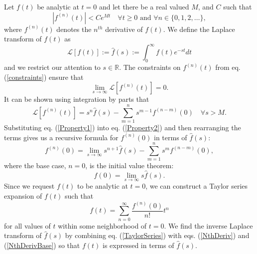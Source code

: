 Let $f(t)$ be analytic at $t=0$ and let there
  be a real valued $M$, and $C$ such that
\begin{equation}\label{constraints}
  \left|f^{(n)}(t)\right| < Ce^{Mt}\quad \forall t\geq 0\text{ and }\forall n\in\{0,1,2,\dots\},
\end{equation}
where $f^{(n)}(t)$ denotes the $n^{th}$ derivative of $f(t)$.  We
define the Laplace transform of $f(t)$ as
\begin{equation}
  \mathcal{L}[f(t)] := \hat{f}(s) := \int_{0}^\infty f(t)e^{-st}dt
\end{equation}
and we restrict our attention to $s\in\mathbb{R}$.  The constraints on
$f^{(n)}(t)$ from eq. (\ref{constraints}) ensure that
\begin{equation}\label{Property2}
  \lim_{s \to \infty}\mathcal{L}[f^{(n)}(t)] = 0.
\end{equation}
It can be shown using integration by parts that
\begin{equation}\label{Property1}
  \mathcal{L}[f^{(n)}(t)] = s^n\hat{f}(s) - \sum_{m=1}^ns^{m-1}f^{(n-m)}(0)
  \quad \forall s>M.
\end{equation}
Substituting eq. (\ref{Property1}) into eq. (\ref{Property2}) and then
rearranging the terms gives us a recursive formula for $f^{(n)}(0)$ in
terms of $\hat{f}(s)$:
\begin{equation}\label{NthDeriv}
  f^{(n)}(0) = \lim_{s \to \infty} s^{n + 1}\hat{f}(s) -
               \sum_{m=1}^{n} s^{m}f^{(n-m)}(0),
\end{equation}
where the base case, $n=0$, is the initial value theorem:
\begin{equation}\label{NthDerivBase}
  f(0) = \lim_{s \to \infty} s\hat{f}(s).
\end{equation}
Since we request $f(t)$ to be analytic at $t=0$, we can construct a
Taylor series expansion of $f(t)$ such that
\begin{equation}\label{TaylorSeries}
  f(t) = \sum_{n=0}^\infty\frac{f^{(n)}(0)}{n!}t^n
\end{equation}
for all values of $t$ within some neighborhood of $t=0$. We find the
inverse Laplace transform of $\hat{f}(s)$ by combining
eq. (\ref{TaylorSeries}) with eqs. (\ref{NthDeriv}) and
(\ref{NthDerivBase}) so that $f(t)$ is expressed in terms of
$\hat{f}(s)$.


